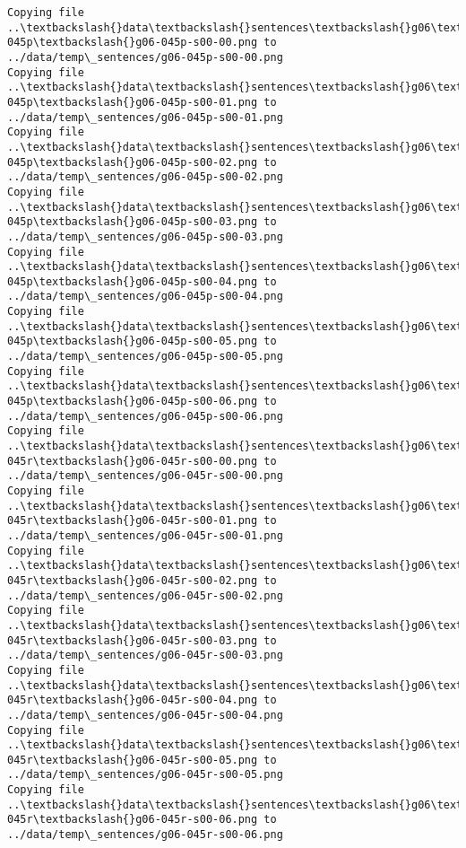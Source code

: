 \documentclass[11pt]{article}
\begin{document}
\begin{Verbatim}[commandchars=\\\{\}]
Copying file ..\textbackslash{}data\textbackslash{}sentences\textbackslash{}g06\textbackslash{}g06-045p\textbackslash{}g06-045p-s00-00.png to
../data/temp\_sentences/g06-045p-s00-00.png
Copying file ..\textbackslash{}data\textbackslash{}sentences\textbackslash{}g06\textbackslash{}g06-045p\textbackslash{}g06-045p-s00-01.png to
../data/temp\_sentences/g06-045p-s00-01.png
Copying file ..\textbackslash{}data\textbackslash{}sentences\textbackslash{}g06\textbackslash{}g06-045p\textbackslash{}g06-045p-s00-02.png to
../data/temp\_sentences/g06-045p-s00-02.png
Copying file ..\textbackslash{}data\textbackslash{}sentences\textbackslash{}g06\textbackslash{}g06-045p\textbackslash{}g06-045p-s00-03.png to
../data/temp\_sentences/g06-045p-s00-03.png
Copying file ..\textbackslash{}data\textbackslash{}sentences\textbackslash{}g06\textbackslash{}g06-045p\textbackslash{}g06-045p-s00-04.png to
../data/temp\_sentences/g06-045p-s00-04.png
Copying file ..\textbackslash{}data\textbackslash{}sentences\textbackslash{}g06\textbackslash{}g06-045p\textbackslash{}g06-045p-s00-05.png to
../data/temp\_sentences/g06-045p-s00-05.png
Copying file ..\textbackslash{}data\textbackslash{}sentences\textbackslash{}g06\textbackslash{}g06-045p\textbackslash{}g06-045p-s00-06.png to
../data/temp\_sentences/g06-045p-s00-06.png
Copying file ..\textbackslash{}data\textbackslash{}sentences\textbackslash{}g06\textbackslash{}g06-045r\textbackslash{}g06-045r-s00-00.png to
../data/temp\_sentences/g06-045r-s00-00.png
Copying file ..\textbackslash{}data\textbackslash{}sentences\textbackslash{}g06\textbackslash{}g06-045r\textbackslash{}g06-045r-s00-01.png to
../data/temp\_sentences/g06-045r-s00-01.png
Copying file ..\textbackslash{}data\textbackslash{}sentences\textbackslash{}g06\textbackslash{}g06-045r\textbackslash{}g06-045r-s00-02.png to
../data/temp\_sentences/g06-045r-s00-02.png
Copying file ..\textbackslash{}data\textbackslash{}sentences\textbackslash{}g06\textbackslash{}g06-045r\textbackslash{}g06-045r-s00-03.png to
../data/temp\_sentences/g06-045r-s00-03.png
Copying file ..\textbackslash{}data\textbackslash{}sentences\textbackslash{}g06\textbackslash{}g06-045r\textbackslash{}g06-045r-s00-04.png to
../data/temp\_sentences/g06-045r-s00-04.png
Copying file ..\textbackslash{}data\textbackslash{}sentences\textbackslash{}g06\textbackslash{}g06-045r\textbackslash{}g06-045r-s00-05.png to
../data/temp\_sentences/g06-045r-s00-05.png
Copying file ..\textbackslash{}data\textbackslash{}sentences\textbackslash{}g06\textbackslash{}g06-045r\textbackslash{}g06-045r-s00-06.png to
../data/temp\_sentences/g06-045r-s00-06.png

\end{Verbatim}
\end{document}
